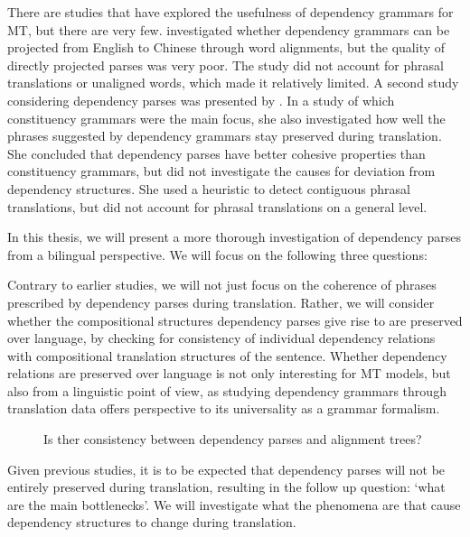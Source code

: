 There are studies that have explored the usefulness of dependency grammars for MT, but there are very few. \cite{hwa2002evaluating} investigated whether dependency grammars can be projected from English to Chinese through word alignments, but the quality of directly projected parses was very poor. The study did not account for phrasal translations or unaligned words, which made it relatively limited. A second study considering dependency parses was presented by \cite{fox2002phrasal}. In a study of which constituency grammars were the main focus, she also investigated how well the phrases suggested by dependency grammars stay preserved during translation. She concluded that dependency parses have better cohesive properties than constituency grammars, but did not investigate the causes for deviation from dependency structures. She used a heuristic to detect contiguous phrasal translations, but did not account for phrasal translations on a general level.
 
In this thesis, we will present a more thorough investigation of dependency parses from a bilingual perspective. We will focus on the following three questions:

Contrary to earlier studies, we will not just focus on the coherence of phrases prescribed by dependency parses during translation. Rather, we will consider whether the compositional structures dependency parses give rise to are preserved over language, by checking for consistency of individual dependency relations with compositional translation structures of the sentence. Whether dependency relations are preserved over language is not only interesting for MT models, but also from a linguistic point of view, as studying dependency grammars through translation data offers perspective to its universality as a grammar formalism.\\

\begin{figure}[!ht]

\centering

\caption{Is ther consistency between dependency parses and alignment trees?}\label{fig:depshats}
\end{figure}

Given previous studies, it is to be expected that dependency parses will not be entirely preserved during translation, resulting in the follow up question: `what are the main bottlenecks'. We will investigate what the phenomena are that cause dependency structures to change during translation.

